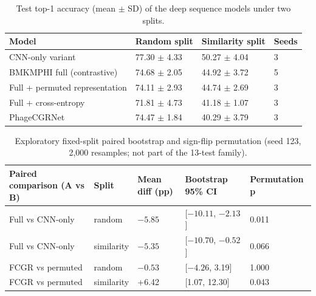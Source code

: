 \documentclass[utf8]{FrontiersinVancouver}
\begin{document}
\begin{table}[ht]
\centering
\renewcommand{\arraystretch}{1.25}
\caption{Test top-1 accuracy (mean $\pm$ SD) of the deep sequence models under two splits.}\label{tab:3}
\small
\begin{tabular}{l l l l}
\hline
Model & Random split & Similarity split & Seeds \\
\hline
CNN-only variant & 77.30 $\pm$ 4.33 & 50.27 $\pm$ 4.04 & 3 \\
BMKMPHI full (contrastive) & 74.68 $\pm$ 2.05 & 44.92 $\pm$ 3.72 & 5 \\
Full + permuted representation & 74.11 $\pm$ 2.93 & 44.74 $\pm$ 2.69 & 3 \\
Full + cross-entropy & 71.81 $\pm$ 4.73 & 41.18 $\pm$ 1.07 & 3 \\
PhageCGRNet & 74.47 $\pm$ 1.84 & 40.29 $\pm$ 3.79 & 3 \\
\hline
\end{tabular}
\end{table}

\begin{table}[ht]
\centering
\renewcommand{\arraystretch}{1.3}
\caption{Exploratory fixed-split paired bootstrap and sign-flip permutation (seed 123, 2,000 resamples; not part of the 13-test family).}\label{tab:4}
\footnotesize
\begin{tabular}{p{3.4cm} p{2.0cm} p{2.2cm} p{3.2cm} p{2.4cm}}
\hline
Paired comparison (A vs B) & Split & Mean diff (pp) & Bootstrap 95\% CI & Permutation p \\
\hline
Full vs CNN-only & random & $-5.85$ & [$-10.11$, $-2.13$] & 0.011 \\
Full vs CNN-only & similarity & $-5.35$ & [$-10.70$, $-0.52$] & 0.066 \\
FCGR vs permuted & random & $-0.53$ & [$-4.26$, 3.19] & 1.000 \\
FCGR vs permuted & similarity & +6.42 & [1.07, 12.30] & 0.043 \\
\hline
\end{tabular}
\end{table}
\end{document}
